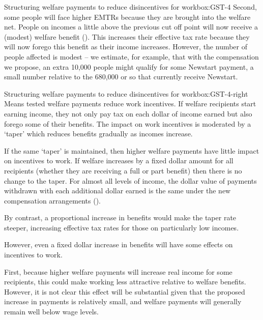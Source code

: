 {\begin{lultrabox}{Structuring welfare payments to reduce disincentives for work}{box:GST-4}
Second, some people will face higher EMTRs because they are brought into the welfare net. People on incomes a little above the previous cut off point will now receive a (modest) welfare benefit (). This increases their effective tax rate because they will now forego this benefit as their income increases. However, the number of people affected is modest – we estimate, for example, that with the compensation we propose, an extra 10,000 people might qualify for some Newstart payment, a small number relative to the 680,000 or so that currently receive Newstart. 
\end{lultrabox}
\begin{rultrabox}{Structuring welfare payments to reduce disincentives for work}{box:GST-4-right}
Means tested welfare payments reduce work incentives. If welfare recipients start earning income, they not only pay tax on each dollar of income earned but also forego some of their benefits. The impact on work incentives is moderated by a ‘taper’ which reduces benefits gradually as incomes increase.

If the same ‘taper’ is maintained, then higher welfare payments have little impact on incentives to work. If welfare increases by a fixed dollar amount for all recipients (whether they are receiving a full or part benefit) then there is no change to the taper. For almost all levels of income, the dollar value of payments withdrawn with each additional dollar earned is the same under the new compensation arrangements (). 

By contrast, a proportional increase in benefits would make the taper rate steeper, increasing effective tax rates for those on particularly low incomes.

However, even a fixed dollar increase in benefits will have some effects on incentives to work.  

First, because higher welfare payments will increase real income for some recipients, this could make working less attractive relative to welfare benefits. However, it is not clear this effect will be substantial given that the proposed increase in payments is relatively small, and welfare payments will generally remain well below wage levels. 


\end{rultrabox}}
